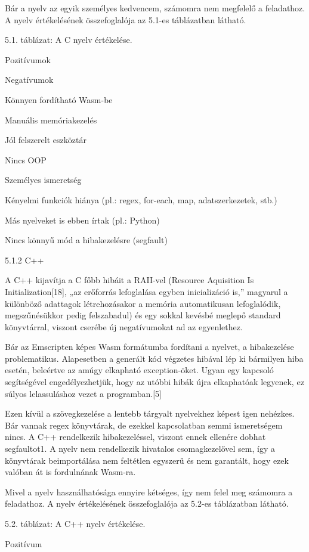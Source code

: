 Bár a nyelv az egyik személyes kedvencem, számomra nem megfelelő a feladathoz. A nyelv értékelésének összefoglalója az 5.1-es táblázatban látható.

5.1. táblázat: A C nyelv értékelése.

Pozitívumok

Negatívumok

Könnyen fordítható Wasm-be

Manuális memóriakezelés

Jól felszerelt eszköztár

Nincs OOP

Személyes ismeretség

Kényelmi funkciók hiánya (pl.: regex, for-each, map, adatszerkezetek, stb.)

Más nyelveket is ebben írtak (pl.: Python)

Nincs könnyű mód a hibakezelésre (segfault)



5.1.2 C++

A C++ kijavítja a C főbb hibáit a RAII-vel (Resource Aquisition Is Initialization[18], „az erőforrás lefoglalása egyben inicializáció is,” magyarul a különböző adattagok létrehozásakor a memória automatikusan lefoglalódik, megszűnésükkor pedig felszabadul) és egy sokkal kevésbé meglepő standard könyvtárral, viszont cserébe új negatívumokat ad az egyenlethez. 

Bár az Emscripten képes Wasm formátumba fordítani a nyelvet, a hibakezelése problematikus. Alapesetben a generált kód végzetes hibával lép ki bármilyen hiba esetén, beleértve az amúgy elkapható exception-öket. Ugyan egy kapcsoló segítségével engedélyezhetjük, hogy az utóbbi hibák újra elkaphatóak legyenek, ez súlyos lelassuláshoz vezet a programban.[5]

Ezen kívül a szövegkezelése a lentebb tárgyalt nyelvekhez képest igen nehézkes. Bár vannak regex könyvtárak, de ezekkel kapcsolatban semmi ismeretségem nincs. A C++ rendelkezik hibakezeléssel, viszont ennek ellenére dobhat segfaultot1. A nyelv nem rendelkezik hivatalos csomagkezelővel sem, így a könyvtárak beimportálása nem feltétlen egyszerű és nem garantált, hogy ezek valóban át is fordulnának Wasm-ra.

Mivel a nyelv használhatósága ennyire kétséges, így nem felel meg számomra a feladathoz. A nyelv értékelésének összefoglalója az 5.2-es táblázatban látható.

5.2. táblázat: A C++ nyelv értékelése.

Pozitívum

